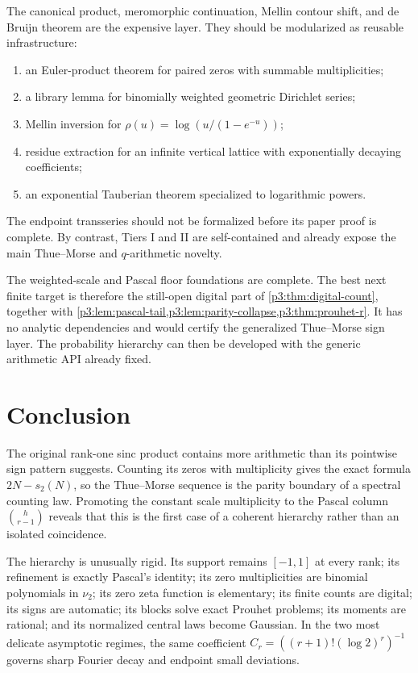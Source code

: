 \documentclass[11pt,oneside]{article}
\theoremstyle{definition}
\theoremstyle{remark}
\begin{document}
The canonical product, meromorphic continuation, Mellin contour shift, and de Bruijn theorem are the expensive layer.  They should be modularized as reusable infrastructure:
\begin{enumerate}[label=\textbf{IV.\arabic*}]
\item an Euler-product theorem for paired zeros with summable multiplicities;
\item a library lemma for binomially weighted geometric Dirichlet series;
\item Mellin inversion for $\rho(u)=\log(u/(1-e^{-u}))$;
\item residue extraction for an infinite vertical lattice with exponentially decaying coefficients;
\item an exponential Tauberian theorem specialized to logarithmic powers.
\end{enumerate}
The endpoint transseries should not be formalized before its paper proof is complete.  By contrast, Tiers I and II are self-contained and already expose the main Thue--Morse and $q$-arithmetic novelty.

\begin{statusbox}
The weighted-scale and Pascal floor foundations are complete.  The best next
finite target is therefore the still-open digital part of
\cref{p3:thm:digital-count}, together with
\cref{p3:lem:pascal-tail,p3:lem:parity-collapse,p3:thm:prouhet-r}.  It has no analytic
dependencies and would certify the generalized Thue--Morse sign layer.  The
probability hierarchy can then be developed with the generic arithmetic API
already fixed.
\end{statusbox}

\section{Conclusion}\label{p3:sec:conclusion}

The original rank-one sinc product contains more arithmetic than its pointwise sign pattern suggests.  Counting its zeros with multiplicity gives the exact formula $2N-s_2(N)$, so the Thue--Morse sequence is the parity boundary of a spectral counting law.  Promoting the constant scale multiplicity to the Pascal column $\binom h{r-1}$ reveals that this is the first case of a coherent hierarchy rather than an isolated coincidence.

The hierarchy is unusually rigid.  Its support remains $[-1,1]$ at every rank; its refinement is exactly Pascal's identity; its zero multiplicities are binomial polynomials in $\nu_2$; its zero zeta function is elementary; its finite counts are digital; its signs are automatic; its blocks solve exact Prouhet problems; its moments are rational; and its normalized central laws become Gaussian.  In the two most delicate asymptotic regimes, the same coefficient
$C_r=((r+1)!(\log2)^r)^{-1}$ governs sharp Fourier decay and endpoint small deviations.
\end{document}

